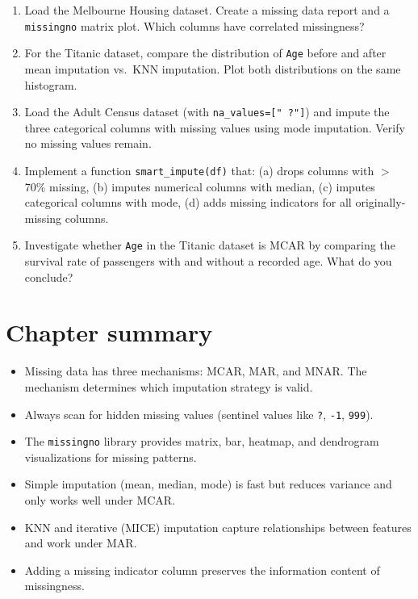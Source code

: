 \begin{exercise}
\begin{enumerate}
  \item Load the Melbourne Housing dataset. Create a missing data report and a \texttt{missingno} matrix plot. Which columns have correlated missingness?
  \item For the Titanic dataset, compare the distribution of \texttt{Age} before and after mean imputation vs.\ KNN imputation. Plot both distributions on the same histogram.
  \item Load the Adult Census dataset (with \texttt{na\_values=[" ?"]}) and impute the three categorical columns with missing values using mode imputation. Verify no missing values remain.
  \item Implement a function \texttt{smart\_impute(df)} that: (a) drops columns with $>$70\% missing, (b) imputes numerical columns with median, (c) imputes categorical columns with mode, (d) adds missing indicators for all originally-missing columns.
  \item Investigate whether \texttt{Age} in the Titanic dataset is MCAR by comparing the survival rate of passengers with and without a recorded age. What do you conclude?
\end{enumerate}
\end{exercise}

\section{Chapter summary}

\begin{itemize}
  \item Missing data has three mechanisms: MCAR, MAR, and MNAR. The mechanism determines which imputation strategy is valid.
  \item Always scan for hidden missing values (sentinel values like \texttt{?}, \texttt{-1}, \texttt{999}).
  \item The \texttt{missingno} library provides matrix, bar, heatmap, and dendrogram visualizations for missing patterns.
  \item Simple imputation (mean, median, mode) is fast but reduces variance and only works well under MCAR.
  \item KNN and iterative (MICE) imputation capture relationships between features and work under MAR.
  \item Adding a missing indicator column preserves the information content of missingness.
\end{itemize}

